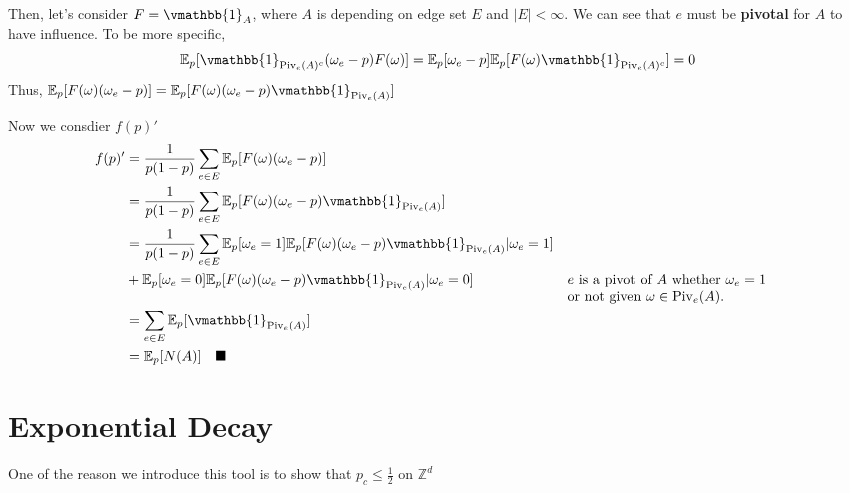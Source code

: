 \documentclass[12pt,a4paper]{report}
\theoremstyle{definition}
\begin{document}
\begin{enumerate}
		Then, let's consider $F = \vmathbb{1}_A$, where $A$ is depending on edge set $E$ and $|E| < \infty$. We can see that $e$ must be \textbf{pivotal} for $A$ to have influence. 
		To be more specific, 
		$$
		\mathbb{E}_p[\vmathbb{1}_{\text{Piv}_e(A)^c}(\omega_e - p)F(\omega)] = \mathbb{E}_p[\omega_e - p] \mathbb{E}_p[F(\omega)\vmathbb{1}_{\text{Piv}_e(A)^c}] =  0
		$$
		Thus, $\mathbb{E}_p[F(\omega)(\omega_e - p)] = \mathbb{E}_p[F(\omega)(\omega_e - p) \vmathbb{1}_{\text{Piv}_e(A)}]$	
		
		Now we consdier $f(p)'$
		\begin{equation*}
			\begin{aligned}
				f(p)' &= \frac{1}{p(1-p)}\sum_{e \in E} \mathbb{E}_p[F(\omega)(\omega_e - p)] 
				   \\ &= \frac{1}{p(1-p)}\sum_{e \in E} \mathbb{E}_p[F(\omega)(\omega_e - p) \vmathbb{1}_{\text{Piv}_e(A)}]	
				   \\ &= \frac{1}{p(1-p)}\sum_{e \in E} \mathbb{E}_p[\omega_e = 1]\mathbb{E}_p[F(\omega)(\omega_e - p) \vmathbb{1}_{\text{Piv}_e(A)}|\omega_e = 1] 
				   \\ &+ \mathbb{E}_p[\omega_e = 0]\mathbb{E}_p[F(\omega)(\omega_e - p) \vmathbb{1}_{\text{Piv}_e(A)} | \omega_e = 0]	&& \parbox[t]{5cm}{$e$ is a pivot of $A$ whether $\omega_e = 1$ or not given $\omega \in \text{Piv}_e(A)$.}	 
				   \\ &= \sum_{e \in E} \mathbb{E}_p[\vmathbb{1}_{\text{Piv}_e(A)}]	
				   \\ &= \mathbb{E}_p[N(A)]\quad \blacksquare 
			\end{aligned}
		\end{equation*}
\end{enumerate}

\chapter{Exponential Decay}
One of the reason we introduce this tool is to show that $p_c \leq \frac{1}{2}$ on $\mathbb{Z}^d$ 
\end{document}
